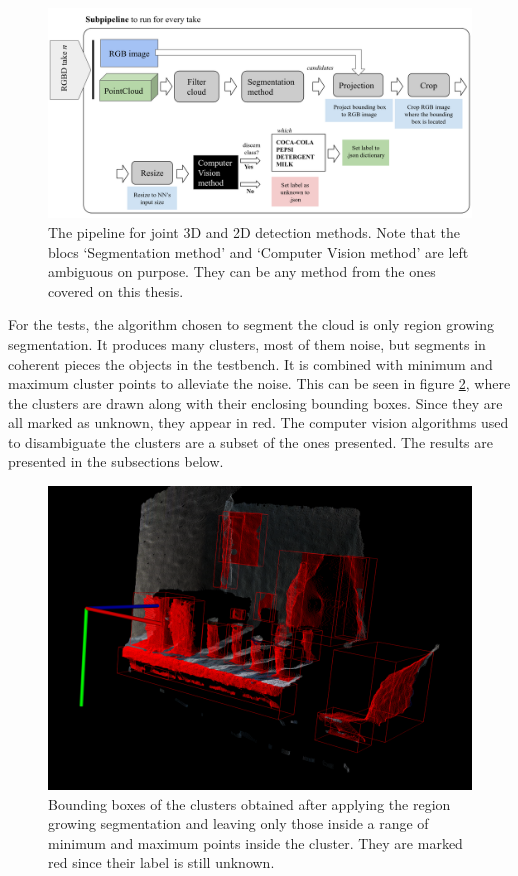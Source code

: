 \documentclass[../main.tex]{subfiles}
\begin{document}
\begin{figure}[H]
    \centering
    \includegraphics[width=1\linewidth]{images/2D_3D_pipeline.png}
    \caption{The pipeline for joint 3D and 2D detection methods. Note that the blocs `Segmentation method' and `Computer Vision method' are left ambiguous on purpose. They can be any method from the ones covered on this thesis.}
    \label{fig:2D_3D_pipeline}
\end{figure}

For the tests, the algorithm chosen to segment the cloud is only region growing segmentation. It produces many clusters, most of them noise, but segments in coherent pieces the objects in the testbench. It is combined with minimum and maximum cluster points to alleviate the noise. This can be seen in figure \ref{fig:annotated_3Dbboxes_allUnknown}, where the clusters are drawn along with their enclosing bounding boxes. Since they are all marked as unknown, they appear in red. The computer vision algorithms used to disambiguate the clusters are a subset of the ones presented. The results are presented in the subsections below.

\begin{figure}[H]
    \centering
    \includegraphics[width=0.9\linewidth]{images/annotated_3Dbboxes_allUnknown.png}
    \caption{Bounding boxes of the clusters obtained after applying the region growing segmentation and leaving only those inside a range of minimum and maximum points inside the cluster. They are marked red since their label is still unknown.}
    \label{fig:annotated_3Dbboxes_allUnknown}
\end{figure}
\end{document}
